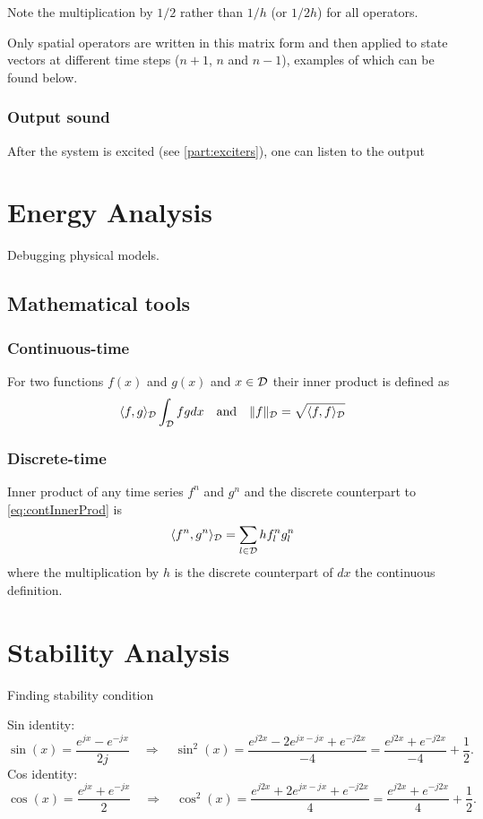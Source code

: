 Note the multiplication by $1/2$ rather than $1/h$ (or $1/2h$) for all operators.


Only spatial operators are written in this matrix form and then applied to state vectors at different time steps ($n+1$, $n$ and $n-1$), examples of which can be found below.

\subsubsection{Output sound}
After the system is excited (see \ref{part:exciters}), one can listen to the output


\section{Energy Analysis}
Debugging physical models.

\subsection{Mathematical tools}
\subsubsection{Continuous-time}
For two functions $f(x)$ and $g(x)$ and $x\in\mathcal{D}$ their inner product is defined as
\begin{equation}\label{eq:contInnerProd}
    \langle f, g\rangle_{\mathcal{D}} \int_{\mathcal{D}} fg dx \quad \text{and} \quad \lVert f \rVert_{\mathcal{D}} = \sqrt{\langle f, f \rangle_{\mathcal{D}}}
\end{equation}


\subsubsection{Discrete-time}
Inner product of any time series $f^n$ and $g^n$ and the discrete counterpart to \eqref{eq:contInnerProd} is
\begin{equation}\label{eq:discInnerProd}
    \langle f^n, g^n \rangle_{\mathcal{D}} = \sum_{l\in\mathcal{D}} h f_l^n g_l^n
\end{equation}
where the multiplication by $h$ is the discrete counterpart of $dx$ the continuous definition. 

\section{Stability Analysis}
Finding stability condition

Sin identity:
\begin{equation}\label{eq:sinIdentity}
    \sin(x) = \frac{e^{jx} - e^{-jx}}{2j}\quad \Longrightarrow \quad \sin^2(x) = \frac{e^{j2x} - 2e^{jx-jx}+ e^{-j2x}}{-4} = \frac{e^{j2x} + e^{-j2x}}{-4} + \frac{1}{2}.
\end{equation}
Cos identity:
\begin{equation}\label{eq:cosIdentity}
    \cos(x) = \frac{e^{jx} + e^{-jx}}{2}\quad \Longrightarrow \quad \cos^2(x) = \frac{e^{j2x} + 2e^{jx-jx}+ e^{-j2x}}{4} = \frac{e^{j2x} + e^{-j2x}}{4} + \frac{1}{2}.
\end{equation}

